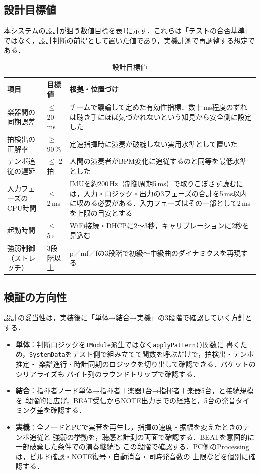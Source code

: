 \documentclass[lualatex,book,paper=a4paper,jafontsize=11.5pt,jafontscale=1.05]{jlreq}
\begin{document}
\subsection{設計目標値}
本システムの設計が狙う数値目標を表\ref{tab:design-targets}に示す．これらは「テストの合否基準」
ではなく，設計判断の前提として置いた値であり，実機計測で再調整する想定である．
\begin{table}[H]\centering
  \caption{設計目標値}\label{tab:design-targets}
  \small
  \begin{tabularx}{\linewidth}{>{\raggedright\arraybackslash}p{3.4cm} >{\raggedright\arraybackslash}p{2.1cm} X}
    \toprule
    項目 & 目標値 & 根拠・位置づけ \\
    \midrule
    楽器間の同期誤差 & $\le$ 20\,ms & チームで議論して定めた有効性指標．数十\,ms程度のずれは聴き手にほぼ気づかれないという知見から安全側に設定した \\
    拍検出の正解率 & $\ge$ 90\,\% & 定速指揮時に演奏が破綻しない実用水準として置いた \\
    テンポ追従の遅延 & $\le$ 2拍 & 人間の演奏者がBPM変化に追従するのと同等を最低水準とした \\
    入力フェーズのCPU時間 & $\le$ 2\,ms & IMUを約200\,Hz（制御周期5\,ms）で取りこぼさず読むには，入力・ロジック・出力の3フェーズの合計を5\,ms以内に収める必要がある．入力フェーズはその一部として2\,msを上限の目安とする \\
    起動時間 & $\le$ 5\,s & WiFi接続・DHCPに2〜3秒，キャリブレーションに2秒を見込む \\
    強弱制御（ストレッチ） & 3段階以上 & p／mf／fの3段階で初級〜中級曲のダイナミクスを再現する \\
    \bottomrule
  \end{tabularx}
\end{table}

\subsection{検証の方向性}
設計の妥当性は，実装後に「単体→結合→実機」の3段階で確認していく方針とする．
\begin{itemize}[leftmargin=1.4em, itemsep=2pt]
  \item \textbf{単体}：判断ロジックを\texttt{IModule}派生ではなく\texttt{applyPattern()}関数に
        書くため，\texttt{SystemData}をテスト側で組み立てて関数を呼ぶだけで，拍検出・テンポ推定・
        楽譜進行・時計同期のロジックを切り出して確認できる．パケットのシリアライズも
        バイト列のラウンドトリップで確認する．
  \item \textbf{結合}：指揮者ノード単体→指揮者＋楽器1台→指揮者＋楽器5台，と接続規模を
        段階的に広げ，BEAT受信からNOTE出力までの経路と，5台の発音タイミング差を確認する．
  \item \textbf{実機}：全ノードとPCで実音を再生し，指揮の速度・振幅を変えたときのテンポ追従と
        強弱の挙動を，聴感と計測の両面で確認する．BEATを意図的に一部破棄した条件での演奏継続も
        この段階で確認する．PC側のProcessingは，ビルド確認・NOTE復号・自動消音・同時発音数の
        上限などを個別に確認する．
\end{itemize}
\end{document}
